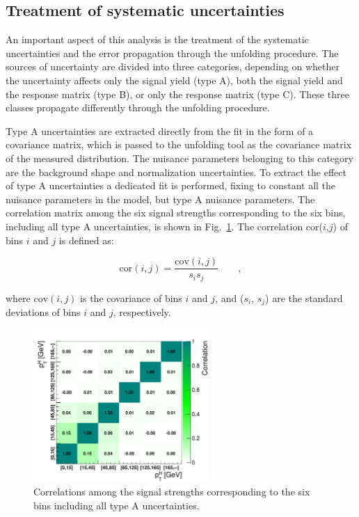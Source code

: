 \subsection{Treatment of systematic uncertainties}

An important aspect of this analysis is the treatment of the systematic
uncertainties and the error propagation through the unfolding procedure.
The sources of uncertainty are divided into three categories, depending
on whether the uncertainty affects only the signal yield (type A), both the signal
yield and the response matrix (type B), or only the response matrix (type C).
These three classes propagate differently through the unfolding procedure.

Type A uncertainties are extracted directly from the fit in the form of a covariance
matrix, which is passed to the unfolding tool as the covariance
matrix of the measured distribution. The nuisance parameters belonging to this category
are the background shape and normalization uncertainties.
To extract the effect of type A uncertainties a dedicated fit is performed,
fixing to constant all the nuisance parameters in the model, but type A nuisance parameters.
The correlation matrix among the six signal strengths corresponding to the six \pth bins, including all type A uncertainties, is shown in Fig.~\ref{fig:typeA_corr}.
The correlation cor($i$,$j$) of bins $i$ and $j$ is defined as:	

\begin{equation}\label{eq:correlation}
\mathrm{cor}(i,j) = \frac{ \mathrm{cov}(i,j) }{  s_{i}s_{j} } \qquad ,
\end{equation} 

where $\mathrm{cov}(i,j)$ is the covariance of bins $i$ and $j$, and ($s_{i}$,
$s_{j}$) are the standard deviations of bins $i$ and $j$,  respectively.

\begin{figure}[!h]
\centering
\includegraphics[width=0.6\textwidth]{images/typeACovMatrix.pdf}
\caption{Correlations among the signal strengths corresponding to the six \pth bins including all type A uncertainties.}\label{fig:typeA_corr}
\end{figure}

